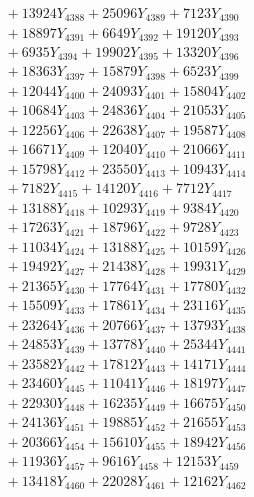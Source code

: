 \documentclass[a4paper,10pt]{article}
\begin{document}
{\begin{align}
&\;  + 13924 Y_{4388} + 25096 Y_{4389} + 7123 Y_{4390} \\[0.3ex]
&\;  + 18897 Y_{4391} + 6649 Y_{4392} + 19120 Y_{4393} \\[0.3ex]
&\;  + 6935 Y_{4394} + 19902 Y_{4395} + 13320 Y_{4396} \\[0.3ex]
&\;  + 18363 Y_{4397} + 15879 Y_{4398} + 6523 Y_{4399} \\[0.3ex]
&\;  + 12044 Y_{4400} + 24093 Y_{4401} + 15804 Y_{4402} \\[0.3ex]
&\;  + 10684 Y_{4403} + 24836 Y_{4404} + 21053 Y_{4405} \\[0.3ex]
&\;  + 12256 Y_{4406} + 22638 Y_{4407} + 19587 Y_{4408} \\[0.5ex]\allowbreak
&\;  + 16671 Y_{4409} + 12040 Y_{4410} + 21066 Y_{4411} \\[0.3ex]
&\;  + 15798 Y_{4412} + 23550 Y_{4413} + 10943 Y_{4414} \\[0.3ex]
&\;  + 7182 Y_{4415} + 14120 Y_{4416} + 7712 Y_{4417} \\[0.3ex]
&\;  + 13188 Y_{4418} + 10293 Y_{4419} + 9384 Y_{4420} \\[0.3ex]
&\;  + 17263 Y_{4421} + 18796 Y_{4422} + 9728 Y_{4423} \\[0.3ex]
&\;  + 11034 Y_{4424} + 13188 Y_{4425} + 10159 Y_{4426} \\[0.3ex]
&\;  + 19492 Y_{4427} + 21438 Y_{4428} + 19931 Y_{4429} \\[0.3ex]
&\;  + 21365 Y_{4430} + 17764 Y_{4431} + 17780 Y_{4432} \\[0.3ex]
&\;  + 15509 Y_{4433} + 17861 Y_{4434} + 23116 Y_{4435} \\[0.3ex]
&\;  + 23264 Y_{4436} + 20766 Y_{4437} + 13793 Y_{4438} \\[0.5ex]\allowbreak
&\;  + 24853 Y_{4439} + 13778 Y_{4440} + 25344 Y_{4441} \\[0.3ex]
&\;  + 23582 Y_{4442} + 17812 Y_{4443} + 14171 Y_{4444} \\[0.3ex]
&\;  + 23460 Y_{4445} + 11041 Y_{4446} + 18197 Y_{4447} \\[0.3ex]
&\;  + 22930 Y_{4448} + 16235 Y_{4449} + 16675 Y_{4450} \\[0.3ex]
&\;  + 24136 Y_{4451} + 19885 Y_{4452} + 21655 Y_{4453} \\[0.3ex]
&\;  + 20366 Y_{4454} + 15610 Y_{4455} + 18942 Y_{4456} \\[0.3ex]
&\;  + 11936 Y_{4457} + 9616 Y_{4458} + 12153 Y_{4459} \\[0.3ex]
&\;  + 13418 Y_{4460} + 22028 Y_{4461} + 12162 Y_{4462} \\[0.3ex]

\end{align}}
\end{document}
